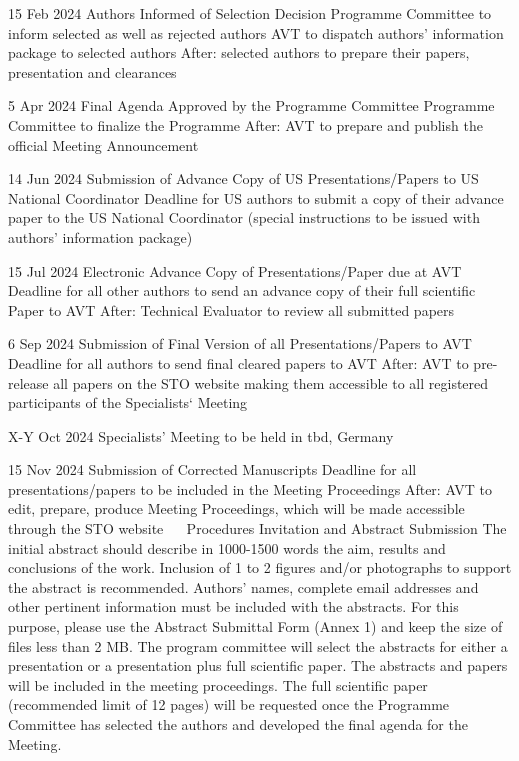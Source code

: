 15 Feb 2024	Authors Informed of Selection Decision
Programme Committee to inform selected as well as rejected authors
AVT to dispatch authors’ information package to selected authors
After: selected authors to prepare their papers, presentation and clearances

5 Apr 2024	Final Agenda Approved by the Programme Committee
Programme Committee to finalize the Programme
After: AVT to prepare and publish the official Meeting Announcement

14 Jun 2024	Submission of Advance Copy of US Presentations/Papers to US National Coordinator
Deadline for US authors to submit a copy of their advance paper to the US National Coordinator (special instructions to be issued with authors’ information package)

15 Jul 2024	Electronic Advance Copy of Presentations/Paper due at AVT
Deadline for all other authors to send an advance copy of their full scientific
Paper to AVT
After: Technical Evaluator to review all submitted papers

6 Sep 2024	Submission of Final Version of all Presentations/Papers to AVT
Deadline for all authors to send final cleared papers to AVT
After: AVT to pre-release all papers on the STO website making them 
accessible to all registered participants of the Specialists‘ Meeting

X-Y Oct 2024	Specialists’ Meeting to be held in tbd, Germany
	
15 Nov 2024	Submission of Corrected Manuscripts
Deadline for all presentations/papers to be included in the Meeting Proceedings
After: AVT to edit, prepare, produce Meeting Proceedings, which will be made accessible through the STO website
 
Procedures
Invitation and Abstract Submission
The initial abstract should describe in 1000-1500 words the aim, results and conclusions of the work. Inclusion of 1 to 2 figures and/or photographs to support the abstract is recommended. Authors’ names, complete email addresses and other pertinent information must be included with the abstracts. For this purpose, please use the Abstract Submittal Form (Annex 1) and keep the size of files less than 2 MB. 
The program committee will select the abstracts for either a presentation or a presentation plus full scientific paper. The abstracts and papers will be included in the meeting proceedings. 
The full scientific paper (recommended limit of 12 pages) will be requested once the Programme Committee has selected the authors and developed the final agenda for the Meeting.

